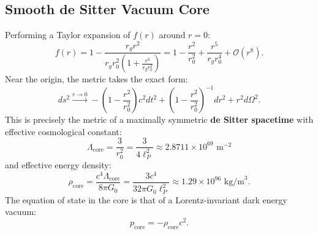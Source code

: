 \documentclass[11pt,a4paper]{article}
\begin{document}
\subsection{Smooth de Sitter Vacuum Core}
Performing a Taylor expansion of $f(r)$ around $r = 0$:
\begin{equation}
f(r) = 1 - \frac{r_g r^2}{r_g r_0^2 \left(1 + \frac{r^3}{r_g r_0^2}\right)} = 1 - \frac{r^2}{r_0^2} + \frac{r^5}{r_g r_0^4} + \mathcal{O}(r^8).
\end{equation}
Near the origin, the metric takes the exact form:
\begin{equation}
ds^2 \xrightarrow{r \to 0} -\left(1 - \frac{r^2}{r_0^2}\right) c^2 dt^2 + \left(1 - \frac{r^2}{r_0^2}\right)^{-1} dr^2 + r^2 d\Omega^2.
\end{equation}
This is precisely the metric of a maximally symmetric \textbf{de Sitter spacetime} with effective cosmological constant:
\begin{equation}
\Lambda_{\mathrm{core}} = \frac{3}{r_0^2} = \frac{3}{4\ell_P^2} \approx 2.8711 \times 10^{69}\text{ m}^{-2}
\end{equation}
and effective energy density:
\begin{equation}
\rho_{\mathrm{core}} = \frac{c^4 \Lambda_{\mathrm{core}}}{8\pi G_0} = \frac{3 c^4}{32\pi G_0 \ell_P^2} \approx 1.29 \times 10^{96}\text{ kg/m}^3.
\end{equation}
The equation of state in the core is that of a Lorentz-invariant dark energy vacuum:
\begin{equation}
p_{\mathrm{core}} = -\rho_{\mathrm{core}} c^2.
\end{equation}
\end{document}

